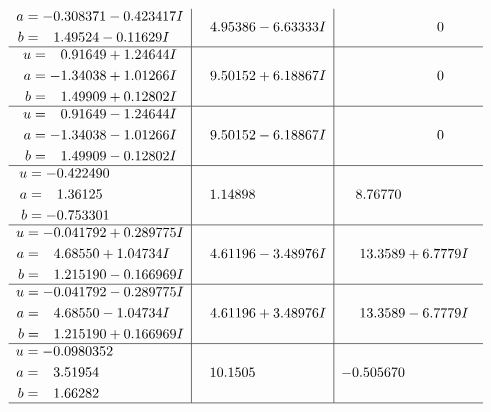 \documentclass[1p]{elsarticle_modified}
\theoremstyle{definition}
\begin{document}
$$\begin{array}{c|c|c}
\begin{aligned}
a &= -0.308371 - 0.423417 I \\
b &= \phantom{-}1.49524 - 0.11629 I\end{aligned}
 & \phantom{-}4.95386 - 6.63333 I & \phantom{-0.000000 } 0 \\ \hline\begin{aligned}
u &= \phantom{-}0.91649 + 1.24644 I \\
a &= -1.34038 + 1.01266 I \\
b &= \phantom{-}1.49909 + 0.12802 I\end{aligned}
 & \phantom{-}9.50152 + 6.18867 I & \phantom{-0.000000 } 0 \\ \hline\begin{aligned}
u &= \phantom{-}0.91649 - 1.24644 I \\
a &= -1.34038 - 1.01266 I \\
b &= \phantom{-}1.49909 - 0.12802 I\end{aligned}
 & \phantom{-}9.50152 - 6.18867 I & \phantom{-0.000000 } 0 \\ \hline\begin{aligned}
u &= -0.422490\phantom{ +0.000000I} \\
a &= \phantom{-}1.36125\phantom{ +0.000000I} \\
b &= -0.753301\phantom{ +0.000000I}\end{aligned}
 & \phantom{-}1.14898\phantom{ +0.000000I} & \phantom{-}8.76770\phantom{ +0.000000I} \\ \hline\begin{aligned}
u &= -0.041792 + 0.289775 I \\
a &= \phantom{-}4.68550 + 1.04734 I \\
b &= \phantom{-}1.215190 - 0.166969 I\end{aligned}
 & \phantom{-}4.61196 - 3.48976 I & \phantom{-}13.3589 + 6.7779 I \\ \hline\begin{aligned}
u &= -0.041792 - 0.289775 I \\
a &= \phantom{-}4.68550 - 1.04734 I \\
b &= \phantom{-}1.215190 + 0.166969 I\end{aligned}
 & \phantom{-}4.61196 + 3.48976 I & \phantom{-}13.3589 - 6.7779 I \\ \hline\begin{aligned}
u &= -0.0980352\phantom{ +0.000000I} \\
a &= \phantom{-}3.51954\phantom{ +0.000000I} \\
b &= \phantom{-}1.66282\phantom{ +0.000000I}\end{aligned}
 & \phantom{-}10.1505\phantom{ +0.000000I} & -0.505670\phantom{ +0.000000I}\\
 \hline 
 \end{array}$$\newpage\newpage\renewcommand{\arraystretch}{1}
\end{document}
